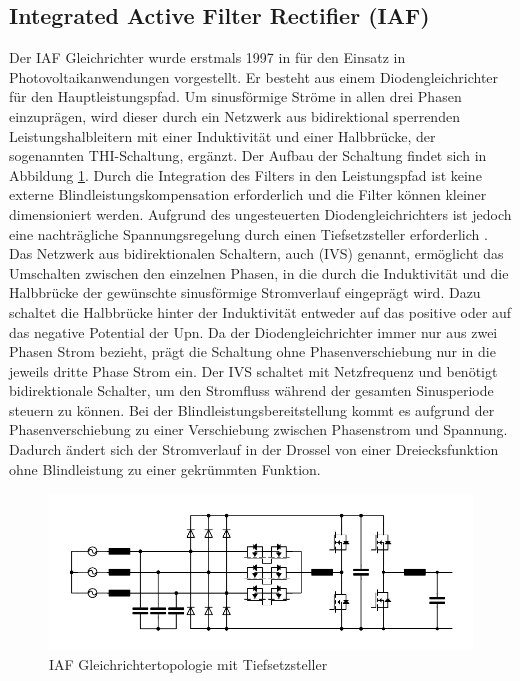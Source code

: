 	\subsection{Integrated Active Filter Rectifier (IAF)} \label{sec:IAF}
	Der \gls{IAF} Gleichrichter wurde erstmals 1997 in \cite{IAFfirst} für den Einsatz in Photovoltaikanwendungen vorgestellt. Er besteht aus einem Diodengleichrichter für den Hauptleistungspfad. Um sinusförmige Ströme in allen drei Phasen einzuprägen, wird dieser durch ein Netzwerk aus bidirektional sperrenden Leistungshalbleitern mit einer Induktivität und einer Halbbrücke, der sogenannten \gls{THI}-Schaltung, ergänzt. Der Aufbau der Schaltung findet sich in Abbildung \ref{fig:iaf}. Durch die Integration des Filters in den Leistungspfad ist keine externe Blindleistungskompensation erforderlich und die Filter können kleiner dimensioniert werden. Aufgrund des ungesteuerten Diodengleichrichters ist jedoch eine nachträgliche Spannungsregelung durch einen Tiefsetzsteller erforderlich \cite{ThesisSchrittwieserBuckTypePFC_2017}.\\
	Das Netzwerk aus bidirektionalen Schaltern, auch  (\gls{IVS}) genannt, ermöglicht das Umschalten zwischen den einzelnen Phasen, in die durch die Induktivität und die Halbbrücke der gewünschte sinusförmige Stromverlauf eingeprägt wird. Dazu schaltet die Halbbrücke hinter der Induktivität entweder auf das positive oder auf das negative Potential der \gls{Upn}. Da der Diodengleichrichter immer nur aus zwei Phasen Strom bezieht, prägt die Schaltung ohne Phasenverschiebung nur in die jeweils dritte Phase Strom ein. Der \gls{IVS} schaltet mit Netzfrequenz und benötigt bidirektionale Schalter, um den Stromfluss während der gesamten Sinusperiode steuern zu können. Bei der Blindleistungsbereitstellung kommt es aufgrund der Phasenverschiebung zu einer Verschiebung zwischen Phasenstrom und Spannung. Dadurch ändert sich der Stromverlauf in der Drossel von einer Dreiecksfunktion ohne Blindleistung zu einer gekrümmten Funktion.
	\begin{figure}
		\centering
		\includegraphics[width=0.9\linewidth]{content/Grafiken/IAF}
		\caption{\gls{IAF} Gleichrichtertopologie mit Tiefsetzsteller}
		\label{fig:iaf}
	\end{figure}
	
